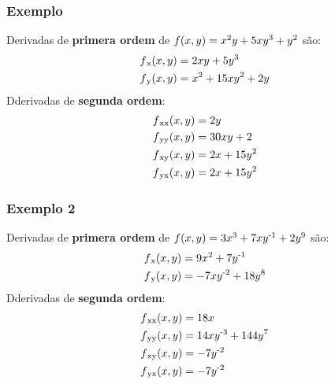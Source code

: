 \documentclass[a4paper]{article}
\begin{document}
\subsubsection*{Exemplo}
Derivadas de \textbf{primera ordem} de $f(x,y) = x\textsuperscript{2}y + 5xy\textsuperscript{3} + y\textsuperscript{2}$ são:
\begin{equation}
    \begin{split}
        f\textsubscript{x}(x,y) & = 2xy + 5y\textsuperscript{3} \\
        f\textsubscript{y}(x,y) & = x\textsuperscript{2} + 15xy\textsuperscript{2} + 2y \\
    \end{split}
\end{equation}
Dderivadas de \textbf{segunda ordem}:
\begin{equation}
    \begin{split}
        f\textsubscript{xx}(x,y) & = 2y \\
        f\textsubscript{yy}(x,y) & = 30xy + 2 \\
        f\textsubscript{xy}(x,y) & = 2x + 15y\textsuperscript{2} \\
        f\textsubscript{yx}(x,y) & = 2x + 15y\textsuperscript{2}
    \end{split}
\end{equation}
\subsubsection*{Exemplo 2}
Derivadas de \textbf{primera ordem} de $f(x,y) = 3x\textsuperscript{3} + 7xy\textsuperscript{-1} + 2y\textsuperscript{9}$ são:
\begin{equation}
    \begin{split}
        f\textsubscript{x}(x,y) & = 9x\textsuperscript{2} + 7y\textsuperscript{-1} \\
        f\textsubscript{y}(x,y) & = -7xy\textsuperscript{-2} + 18y\textsuperscript{8} \\
    \end{split}
\end{equation}
Dderivadas de \textbf{segunda ordem}:
\begin{equation}
    \begin{split}
        f\textsubscript{xx}(x,y) & = 18x \\
        f\textsubscript{yy}(x,y) & = 14xy\textsuperscript{-3} + 144y\textsuperscript{7} \\
        f\textsubscript{xy}(x,y) & = -7y\textsuperscript{-2} \\
        f\textsubscript{yx}(x,y) & = -7y\textsuperscript{-2}
    \end{split}
\end{equation}
\end{document}
